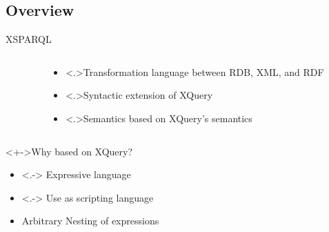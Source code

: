 \subsection*{Overview}

\begin{frame}{XSPARQL}

    \begin{columns}
      \begin{column}{0.25\linewidth}
      \end{column}
      \begin{column}{0.65\linewidth}
        \begin{block}{}
          \begin{itemize}
          \item<+-> \alert<.>{Transformation language} between RDB, XML, and RDF
          \item<+-> \alert<.>{Syntactic} extension of XQuery
          \item<+-> \alert<.>{Semantics} based on XQuery's semantics
          \end{itemize}
        \end{block}
      \end{column}
    \end{columns}
    
    \vspace{10pt}

    \begin{block}<+->{Why based on XQuery? }
      \begin{itemize}
      \item<.-> Expressive language
      \item<.-> Use as scripting language
      \item<+-> Arbitrary Nesting of expressions
      \end{itemize}
    \end{block}

\end{frame}


